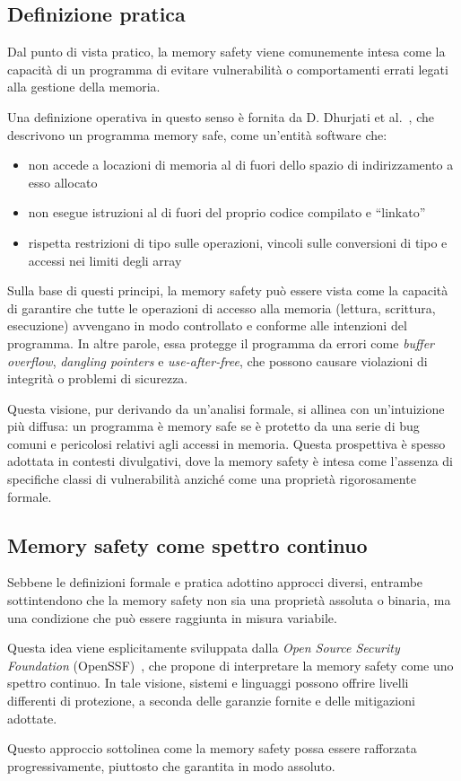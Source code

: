 \subsection{Definizione pratica}
\label{sec:practical_definition}

Dal punto di vista pratico, la memory safety viene comunemente intesa come la capacità
di un programma di evitare vulnerabilità o comportamenti errati legati alla gestione
della memoria.

Una definizione operativa in questo senso è fornita da D. Dhurjati et al.~\cite{memory_safety_without_runtime_checks},
che descrivono un programma memory safe, come un'entità software che:
\begin{itemize}
  \item non accede a locazioni di memoria al di fuori dello spazio di indirizzamento
    a esso allocato

  \item non esegue istruzioni al di fuori del proprio codice compilato e ``linkato''

  \item rispetta restrizioni di tipo sulle operazioni, vincoli sulle conversioni
    di tipo e accessi nei limiti degli array
\end{itemize}

Sulla base di questi principi, la memory safety può essere vista come la
capacità di garantire che tutte le operazioni di accesso alla memoria (lettura,
scrittura, esecuzione) avvengano in modo controllato e conforme alle intenzioni
del programma. In altre parole, essa protegge il programma da errori come
\textit{buffer overflow}, \textit{dangling pointers} e \textit{use-after-free}, che
possono causare violazioni di integrità o problemi di sicurezza.

Questa visione, pur derivando da un'analisi formale, si allinea con un'intuizione
più diffusa: un programma è memory safe se è protetto da una serie di bug comuni
e pericolosi relativi agli accessi in memoria. Questa prospettiva è spesso adottata
in contesti divulgativi, dove la memory safety è intesa come l'assenza di
specifiche classi di vulnerabilità anziché come una proprietà rigorosamente
formale.

\subsection{Memory safety come spettro continuo}
\label{sec:continuum_definition}

Sebbene le definizioni formale e pratica adottino approcci diversi, entrambe
sottintendono che la memory safety non sia una proprietà assoluta o binaria, ma una
condizione che può essere raggiunta in misura variabile.

Questa idea viene esplicitamente sviluppata dalla \textit{Open Source Security
Foundation} (OpenSSF)~\cite{memory_safety_continuum}, che propone di interpretare
la memory safety come uno spettro continuo. In tale visione, sistemi e linguaggi
possono offrire livelli differenti di protezione, a seconda delle garanzie
fornite e delle mitigazioni adottate.

Questo approccio sottolinea come la memory safety possa essere rafforzata
progressivamente, piuttosto che garantita in modo assoluto.